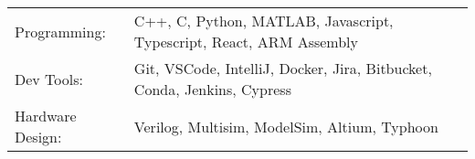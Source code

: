 \begin{tabularx}{\linewidth}{@{}l X@{}}
Programming: &  \normalsize{C++, C, Python, MATLAB, Javascript, Typescript, React, ARM Assembly}\\
Dev Tools:  &  \normalsize{Git, VSCode, IntelliJ, Docker, Jira, Bitbucket, Conda, Jenkins, Cypress}\\
Hardware Design: & \normalsize{Verilog, Multisim, ModelSim, Altium, Typhoon} \\
\end{tabularx}